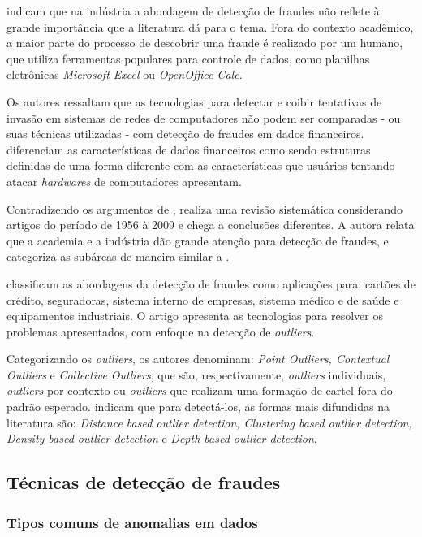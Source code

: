 \documentclass[smallextended]{svjour3}
\begin{document}
\cite{Flegel2010} indicam que na indústria a abordagem de detecção de fraudes não reflete à grande importância que a literatura dá para o tema. Fora do contexto acadêmico, a maior parte do processo de descobrir uma fraude é realizado por um humano, que utiliza ferramentas populares para controle de dados, como planilhas eletrônicas \emph{Microsoft Excel} ou \emph{OpenOffice Calc}. 

Os autores ressaltam que as tecnologias para detectar e coibir tentativas de invasão em sistemas de redes de computadores não podem ser comparadas - ou suas técnicas utilizadas - com detecção de fraudes em dados financeiros. \cite{Flegel2010} diferenciam as características de dados financeiros como sendo estruturas definidas de uma forma diferente com as características que usuários tentando atacar \emph{hardwares} de computadores apresentam.

Contradizendo os argumentos de \cite{Flegel2010}, \cite{Pejic-Bach2010} realiza uma revisão sistemática considerando artigos do período de 1956 à 2009 e chega a conclusões diferentes. A autora relata que a academia e a indústria dão grande atenção para detecção de fraudes, e categoriza as subáreas de maneira similar a \cite{Abdallah2016}.

\cite{Bansal2016} classificam as abordagens da detecção de fraudes como aplicações para: cartões de crédito, seguradoras, sistema interno de empresas, sistema médico e de saúde e equipamentos industriais. O artigo apresenta as tecnologias para resolver os problemas apresentados, com enfoque na detecção de \emph{outliers}. 

Categorizando os \emph{outliers}, os autores denominam: \emph{Point Outliers, Contextual Outliers} e \emph{Collective Outliers}, que são, respectivamente, \emph{outliers} individuais, \emph{outliers} por contexto ou \emph{outliers} que realizam uma formação de cartel fora do padrão esperado. \cite{Bansal2016} indicam que para detectá-los, as formas mais difundidas na literatura são: \emph{Distance based outlier detection, Clustering based outlier detection, Density based outlier detection} e \emph{Depth based outlier detection}.

\subsection{Técnicas de detecção de fraudes}
	
\subsubsection{Tipos comuns de anomalias em dados}
\end{document}
